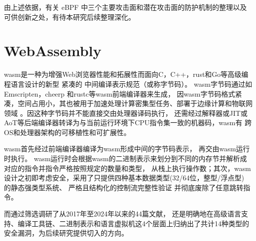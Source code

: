 \documentclass[12pt,a4paper]{article}
\begin{document}
\begin{sloppypar}
\begin{CJK*}{UTF8}{song}
	由上述依据，有关 eBPF 中三个主要攻击面和潜在攻击面的防护机制的整理以及可供创新之处，有待本研究后续整理深化。

	\section{WebAssembly}
	wasm是一种为增强Web浏览器性能和拓展性\cite{haasBringingWebSpeed2017}而面向C，C++，rust和Go等高级编程语言设计的新型
	紧凑的\cite{yanUnderstandingPerformanceWebassembly2021,titzerFastInplaceInterpreter2022,Daniel2019DiscoveringVI}
	中间编译表示规范\cite{wasmCommunityGroup,lehmannWasabiFrameworkDynamically2019,lehmannEverythingOldNew,
	bhansaliFirstLookCode2022,waseemIssuesTheirCauses2024}（或称字节码）。
	wasm字节码通过如Emscripten\cite{FrontEndCompileremscripten}，cheerp\cite{FrontEndCompilerCheerp}
	和rustc等wasm前端编译器来生成\cite{romanoEmpiricalStudyBugs2021}，
	因wasm字节码格式紧凑，空间占用小，其也被用于加速处理计算密集型任务\cite{caoWASMixerBinaryObfuscation2023}、部署于边缘计算和物联网领域
	\cite{rayOverviewWebAssemblyIoT2023}。因这种字节码并不能直接交由处理器译码执行，
	还需经过解释器或JIT或AoT等后端编译器转译为与当前运行环境下CPU指令集一致的机器码\cite[6]{zhangResearchWebAssemblyRuntimes2024}，wasm有
	跨OS和处理器架构的可移植性和可扩展性\cite{lehmannEverythingOldNew,waseemIssuesTheirCauses2024,
		lehmannWasabiFrameworkDynamically2019,JayProvablySafe,zhangResearchWebAssemblyRuntimes2024,rayOverviewWebAssemblyIoT2023}。

	wasm首先经过前端编译器编译为wasm形成中间的字节码表示，
	再交由wasm运行时执行\cite{zhangResearchWebAssemblyRuntimes2024}。
	wasm运行时会根据wasm的二进制表示来划分到不同的内存节并解析成对应的指令\cite{skanehiraWrittingWasmRuntime2024}并指令严格按照规定的数量和类型，
	从栈上执行操作数\cite{wasmcoretech}；其次，wasm设计之初即考虑安全\cite{wasmCommunityGroup}，采用了只提供四种基本数据类型(32/64位，整型/浮点型)
	的静态强类型系统\cite{wasmCommunityGroup,groupWebAssemblySpecification2024,WASMDYPA,haasBringingWebSpeed2017}、
	严格\cite{wasmIntelSGX}且结构化\cite{infoflowctrforwasm,lehmannEverythingOldNew}的控制流完整性验证
	并彻底废除了任意跳转指令\cite{wasmcoretech}。
	
	而\textcite{WebAssemblySummaryOnSecurity}通过筛选调研了从2017年至2024年以来的44篇文献，
	还是明确地在高级语言支持、编译工具链、二进制表示和语言虚拟机这4个层面上归纳出了共计14种类型的安全漏洞，为后续研究提供切入的方向。


\end{CJK*}
\end{sloppypar}
\end{document}
